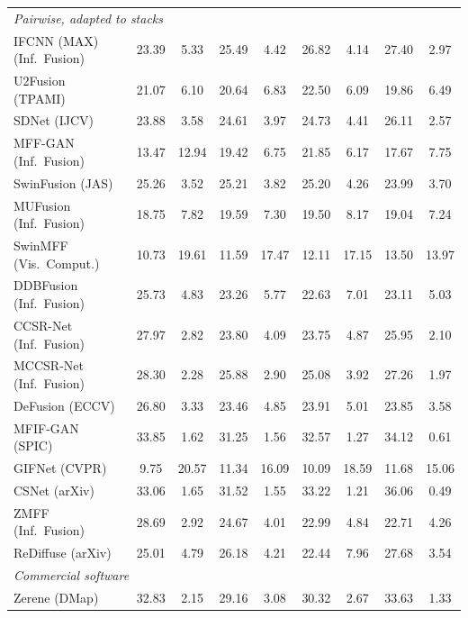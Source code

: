 \begin{table}[!htbp]
\begin{tabular}{lcccccccc}
\midrule
\multicolumn{9}{l}{\textit{Pairwise, adapted to stacks}} \\
IFCNN (MAX) (Inf.\ Fusion)~\cite{zhang2020ifcnn} & 23.39 & 5.33 & 25.49 & 4.42 & 26.82 & 4.14 & 27.40 & 2.97 \\
U2Fusion (TPAMI)~\cite{xu2020u2fusion} & 21.07 & 6.10 & 20.64 & 6.83 & 22.50 & 6.09 & 19.86 & 6.49 \\
SDNet (IJCV)~\cite{zhang2021sdnet} & 23.88 & 3.58 & 24.61 & 3.97 & 24.73 & 4.41 & 26.11 & 2.57 \\
MFF-GAN (Inf.\ Fusion)~\cite{zhang2021mff} & 13.47 & 12.94 & 19.42 & 6.75 & 21.85 & 6.17 & 17.67 & 7.75 \\
SwinFusion (JAS)~\cite{ma2022swinfusion} & 25.26 & 3.52 & 25.21 & 3.82 & 25.20 & 4.26 & 23.99 & 3.70 \\
MUFusion (Inf.\ Fusion)~\cite{cheng2023mufusion} & 18.75 & 7.82 & 19.59 & 7.30 & 19.50 & 8.17 & 19.04 & 7.24 \\
SwinMFF (Vis.\ Comput.)~\cite{xie2024swinmff} & 10.73 & 19.61 & 11.59 & 17.47 & 12.11 & 17.15 & 13.50 & 13.97 \\
DDBFusion (Inf.\ Fusion)~\cite{zhang2025ddbfusion} & 25.73 & 4.83 & 23.26 & 5.77 & 22.63 & 7.01 & 23.11 & 5.03 \\
CCSR-Net (Inf.\ Fusion)~\cite{ZHENG2025102974} & 27.97 & 2.82 & 23.80 & 4.09 & 23.75 & 4.87 & 25.95 & 2.10 \\
MCCSR-Net (Inf.\ Fusion)~\cite{ZHENG2025102974} & 28.30 & 2.28 & 25.88 & 2.90 & 25.08 & 3.92 & 27.26 & 1.97 \\
DeFusion (ECCV)~\cite{liang2022defusion} & 26.80 & 3.33 & 23.46 & 4.85 & 23.91 & 5.01 & 23.85 & 3.58 \\
MFIF-GAN (SPIC)~\cite{wang2021mfifgan} & 33.85 & 1.62 & 31.25 & 1.56 & 32.57 & 1.27 & 34.12 & 0.61 \\
GIFNet (CVPR)~\cite{cheng2025gifnet} & 9.75 & 20.57 & 11.34 & 16.09 & 10.09 & 18.59 & 11.68 & 15.06 \\
CSNet (arXiv)~\cite{csnet2026} & 33.06 & 1.65 & 31.52 & 1.55 & 33.22 & 1.21 & 36.06 & 0.49 \\
ZMFF (Inf.\ Fusion)~\cite{hu2023zmff} & 28.69 & 2.92 & 24.67 & 4.01 & 22.99 & 4.84 & 22.71 & 4.26 \\
ReDiffuse (arXiv)~\cite{rediffuse2026} & 25.01 & 4.79 & 26.18 & 4.21 & 22.44 & 7.96 & 27.68 & 3.54 \\
\midrule
\multicolumn{9}{l}{\textit{Commercial software}} \\
Zerene (DMap) & 32.83 & 2.15 & 29.16 & 3.08 & 30.32 & 2.67 & 33.63 & 1.33 \\

\end{tabular}
\end{table}
